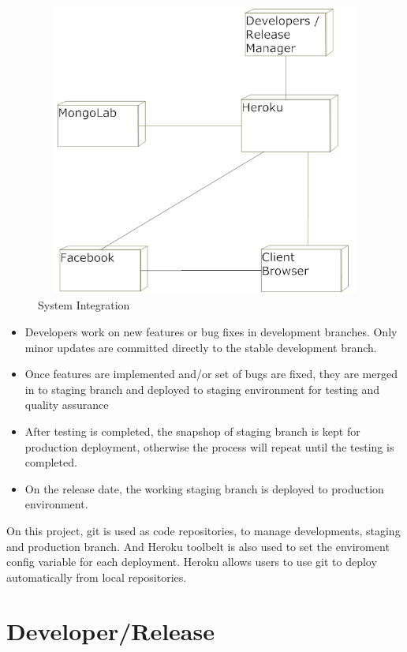 \vspace{3em}
\begin{figure}[H]
\begin{center}
\includegraphics[height=3.8in,width=6.5in]{images/systemIntegration.png}
\caption{System Integration}
\label{fig:system-integration}
\end{center}
\end{figure}

\begin{itemize}
\item Developers work on new features or bug fixes in development branches. Only minor updates are committed directly to the stable development branch.
\item Once features are implemented and/or set of bugs are fixed, they are merged in to staging branch and deployed to staging environment for testing and quality assurance
\item After testing is completed, the snapshop of staging branch is kept for production deployment, otherwise the process will repeat until the testing is completed.
\item On the release date, the working staging branch is deployed to production environment.
\end{itemize}

On this project, git is used as code repositories, to manage developments, staging and production branch. And Heroku toolbelt is also used to set the enviroment config variable for each deployment. Heroku allows users to use git to deploy automatically from local repositories. 
 
\section{Developer/Release}

